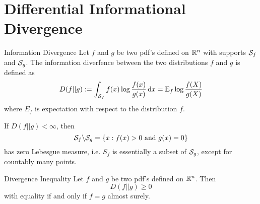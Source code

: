 \documentclass[../main.tex]{subfiles}
\begin{document}
\section{Differential Informational Divergence}
\begin{gbox}{Information Divergence}
    Let $f$ and $g$ be two pdf's defined on $\bR^n$ with supports $\S_f$ and $\S_g$. The information diverfence between the two distributions $f$ and $g$ is defined as \[
    D(f||g) := \int_{\S_f} f(x)\log\frac{f(x)}{g(x)}\dd x = \bE_f \log \frac{f(X)}{g(X)}
    \]
    where $E_f$ is expectation with respect to the distribution $f$.
    \begin{remark}
        If $D(f||g)<\infty$, then \[
        \S_f \backslash \S_g = \{x:\text{$f(x)>0$ and $g(x)=0$}\}
        \] has zero Lebesgue measure, i.e. $S_f$ is essentially a subset of $\S_g$, except for countably many points.
    \end{remark}
\end{gbox}
\begin{bbox}{Divergence Inequality} 
    Let $f$ and $g$ be two pdf's defined on $\bR^n$. Then \[
    D(f||g) \geq 0
    \] with equality if and only if $f=g$ almost surely.
\end{bbox}
\end{document}
